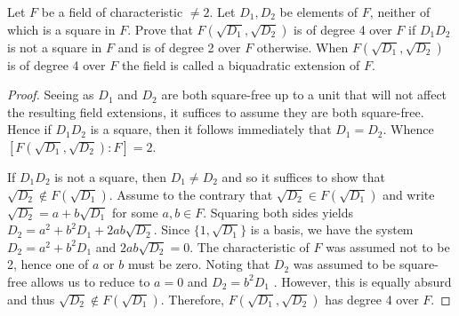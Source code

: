 \documentclass[10pt]{amsart}
\begin{document}
\begin{thm}
  \label{Ex2}
  Let $F$ be a field of characteristic $\neq 2$.
  Let $D_1, D_2$ be elements of $F$, neither of which is a square in $F$.
  Prove that $F(\sqrt{D_1}, \sqrt{D_2})$ is of degree 4 over $F$ if $D_1D_2$ is not a square in $F$ and is of degree 2 over $F$ otherwise.
  When $F(\sqrt{D_1}, \sqrt{D_2})$ is of degree 4 over $F$ the field is called a biquadratic extension of $F$.

  \begin{proof}
    Seeing as $D_1$ and $D_2$ are both square-free up to a unit that will not affect the resulting field extensions, it suffices to assume they are both square-free. 
    Hence if $D_1D_2$ is a square, then it follows immediately that $D_1 = D_2$.
    Whence $[F(\sqrt{D_1},\sqrt{D_2}):F] = 2$.
    
    If $D_1D_2$ is not a square, then $D_1 \neq D_2$ and so it suffices to show that $\sqrt{D_2} \not \in F(\sqrt{D_1})$.
    Assume to the contrary that $\sqrt{D_2} \in F(\sqrt{D_1})$ and write $\sqrt{D_2} = a + b\sqrt{D_1}$ for some $a,b \in F$.
    Squaring both sides yields $D_2 = a^2 + b^2D_1 + 2ab\sqrt{D_2}$.
    Since $\{1, \sqrt{D_1}\}$ is a basis, we have the system $D_2 = a^2 + b^2D_1$ and $2ab\sqrt{D_2} = 0$.
    The characteristic of $F$ was assumed not to be 2, hence one of $a$ or $b$ must be zero.
    Noting that $D_2$ was assumed to be square-free allows us to reduce to $a = 0$ and $D_2 = b^2D_1$ .
    However, this is equally absurd and thus $\sqrt{D_2} \not \in F(\sqrt{D_1})$.
    Therefore, $F(\sqrt{D_1},\sqrt{D_2})$ has degree 4 over $F$.
    
  \end{proof}
\end{thm}
\end{document}
